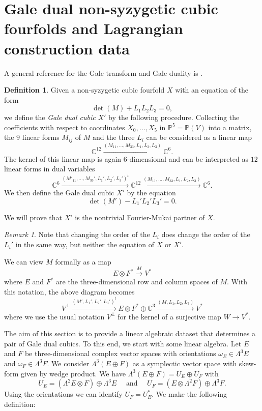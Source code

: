 \documentclass[11pt]{amsart}
\theoremstyle{plain}
\numberwithin{equation}{section}
\theoremstyle{definition}
\newtheorem{definition}[theorem]{Definition}
\theoremstyle{remark}
\newtheorem{remark}[theorem]{Remark}
\newcommand{\C}{\mathbb C}
\newcommand{\quadand}{\quad \text{ and } \quad}
\begin{document}
\section{Gale dual non-syzygetic cubic fourfolds and Lagrangian construction data}\label{sLagrangian}

A general reference for the Gale transform and Gale duality is \cite{EP00}. 

\begin{definition}\label{dGaleDualCubics}
Given a non-syzygetic cubic fourfold $X$ with an equation of the form 
\[ 
\det (M) + L_1L_2L_3 =0,
\] 
we define the \emph{Gale dual cubic} $X'$ by the following procedure. Collecting the coefficients with respect to coordinates $X_0, \dots , X_5$ in $\mathbb{P}^5=\mathbb{P}(V)$ into a matrix, the $9$ linear forms $M_{ij}$ of $M$ and the three $L_i$ can be considered as a linear map
\[
	\C^{12} \xrightarrow{(M_{11}, \dots, M_{33},L_1,L_2,L_3)} \C^6.
\]
The kernel of this linear map is again $6$-dimensional and can be interpreted as $12$ linear forms in dual variables
\[
 	\C^6 \xrightarrow{(M'_{11}, \dots , M_{33}', L_1',L_2',L_3')^t} \C^{12} \xrightarrow{(M_{11}, \dots , M_{33},L_1,L_2,L_3)} \C^6 .
\]
We then define the Gale dual cubic $X'$ by the equation
\[
	\det(M') - L_1'L_2'L_3' = 0.
\]
\end{definition}
We will prove that $X'$ is the nontrivial Fourier-Mukai partner of $X$.

\begin{remark}
    Note that changing the order of the $L_i$ does change the order of the $L_i'$ in the same way, but neither the equation of $X$ or $X'$. 
\end{remark}

We can view $M$ formally as a map
\[
	E \otimes F^* \xrightarrow{M}  V^*
\]
where $E$ and $F^*$ are the three-dimensional row and column spaces of $M$. With this notation, the above diagram becomes 
\[
V^{\perp} \xrightarrow{(M', L_1',L_2',L_3')^t} E \otimes F^* \oplus \mathbb{C}^3  \xrightarrow{(M, L_1,L_2,L_3)} V^* 
\]
where we use the usual notation $V^{\perp}$ for the kernel of a surjective map $W \to V^*$. 

The aim of this section is to provide a linear algebraic dataset that determines a pair of Gale dual cubics. To this end, we start with some linear algebra.
Let $E$ and $F$ be three-dimensional complex vector spaces with orientations $\omega_E \in \Lambda^3 E$ and $\omega_F \in \Lambda^3 F$. We consider $\Lambda^3 (E\oplus F)$ as a symplectic vector space with skew-form given by wedge product. We have $\Lambda^3 (E\oplus F) = U_E \oplus U_F$ with 
\[
	U_E =  (\Lambda^2 E \otimes F) \oplus \Lambda^3 E
	\quadand
	U_F =   (E \otimes \Lambda^2 F)  \oplus  \Lambda^3 F.
\] 
Using the orientations we can identify $U_F = U_E^*$. We make the following definition:
\end{document}
